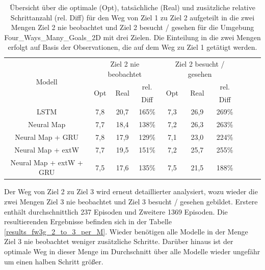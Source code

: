 \begin{table}[h]
  \begin{tabular}{|c|c|c|c|c|c|c|c|c|c|}
    \hline
    \multirow{3}{*}{Modell} & \multicolumn{3}{|c|}{Ziel 2 nie beobachtet} & \multicolumn{3}{|c|}{Ziel 2 besucht / gesehen} \\ \cline{2-7}
    & \multirow{2}{*}{Opt} & \multirow{2}{*}{Real} & rel. & \multirow{2}{*}{Opt} & \multirow{2}{*}{Real} & rel. \\
    & & & Diff & & & Diff \\ \hline
    LSTM & 7,8 & 20,7 & 165\% & 7,3 & 26,9 & 269\% \\ \hline
    Neural Map & 7,7 & 18,4 & 138\% & 7,2 & 26,3 & 263\% \\ \hline
    Neural Map + GRU & 7,8 & 17,9 & 129\% & 7,1 & 23,0 & 224\% \\ \hline
    Neural Map + extW & 7,7 & 19,5 & 151\% & 7,2 & 25,7 & 255\% \\ \hline
    Neural Map + extW + GRU & 7,5 & 17,6 & 135\% & 7,5 & 21,5 & 188\% \\ \hline
  \end{tabular}
  \caption{Übersicht über die optimale (Opt), tatsächliche (Real) und zusätzliche relative Schrittanzahl (rel. Diff) für den Weg von Ziel 1 zu Ziel 2 aufgeteilt in die zwei Mengen \glqq Ziel 2 nie beobachtet\grqq{} und \glqq Ziel 2 besucht / gesehen\grqq{} für die Umgebung \glqq Four\_Ways\_Many\_Goals\_2D\grqq{} mit drei Zielen. Die Einteilung in die zwei Mengen erfolgt auf Basis der Observationen, die auf dem Weg zu Ziel 1 getätigt werden.}
  \label{results_fw3g_1_to_2_per_M}
\end{table}

Der Weg von Ziel 2 zu Ziel 3 wird erneut detaillierter analysiert, wozu wieder die zwei Mengen \glqq Ziel 3 nie beobachtet\grqq{} und \glqq Ziel 3 besucht / gesehen\grqq{} gebildet. Erstere enthält durchschnittlich 237 Episoden und Zweitere 1369 Episoden. Die resultierenden Ergebnisse befinden sich in der Tabelle \ref{results_fw3g_2_to_3_per_M}. Wieder benötigen alle Modelle in der Menge \glqq Ziel 3 nie beobachtet\grqq{} weniger zusätzliche Schritte. Darüber hinaus ist der optimale Weg in dieser Menge im Durchschnitt über alle Modelle wieder ungefähr um einen halben Schritt größer.

